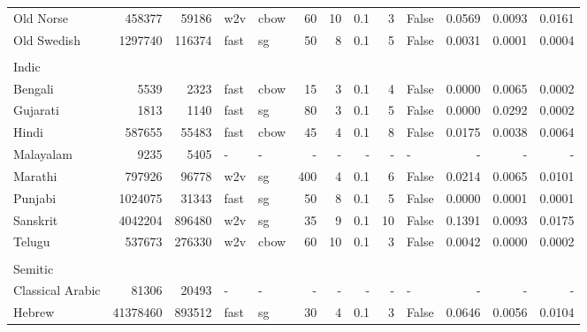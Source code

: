 \documentclass[11pt,a4paper]{article}
\begin{document}
\begin{table}[t]
\begin{tabular}{lrrllrrrrlrrr}
   \quad Old Norse & \num{458377} & \num{59186} & w2v & cbow & \num{60} & \num{10} & \num{.1} & \num{3} & False & \num{0.0569} & \num{0.0093} & \num{0.0161} \\
   \quad Old Swedish & \num{1297740} & \num{116374} &  fast & sg & \num{50} & \num{8} & \num{.1} & \num{5} & False & \num{0.0031} & \num{0.0001} & \num{0.0004} \\
    \multicolumn{13}{l}{}\\[-4pt]
    \multicolumn{13}{l}{Indic}\\
\quad Bengali & \num{5539} & \num{2323} & fast & cbow & \num{15} & \num{3} & \num{.1} & \num{4} & False & \num{0.0000} & \num{0.0065} & \num{0.0002} \\
   \quad Gujarati & \num{1813} & \num{1140} & fast & sg & \num{80} & \num{3} & \num{.1} & \num{5} & False & \num{0.0000} & \num{0.0292} & \num{0.0002} \\
   \quad Hindi & \num{587655} & \num{55483} & fast & cbow & \num{45} & \num{4} & \num{.1} & \num{8} & False & \num{0.0175} & \num{0.0038} & \num{0.0064}\\
   \quad Malayalam & \num{9235} & \num{5405} & - & - & - & - & - & - & - & - & - & - \\
    \quad Marathi  & \num{797926} & \num{96778} & w2v & sg & \num{400} & \num{4} & \num{.1} & \num{6} & False & \num{0.0214} & \num{0.0065} & \num{0.0101} \\
    \quad Punjabi & \num{1024075} & \num{31343} & fast & sg & \num{50} & \num{8} & \num{.1} & \num{5} & False & \num{0.0000} & \num{0.0001} & \num{0.0001} \\
    \quad Sanskrit & \num{4042204} & \num{896480} & w2v & sg & \num{35} & \num{9} & \num{.1} & \num{10} & False & \num{0.1391} & \num{0.0093} & \num{0.0175}\\
    \quad Telugu & \num{537673} & \num{276330} &  w2v & cbow & \num{60} & \num{10} & \num{.1} & \num{3} & False & \num{0.0042} & \num{0.0000} & \num{0.0002} \\
    \multicolumn{13}{l}{}\\[-4pt]
    \multicolumn{13}{l}{Semitic}\\    
  \quad Classical Arabic & \num{81306} & \num{20493} & - & - & - & - & - & - & - & - & - & - \\
   \quad Hebrew & \num{41378460} & \num{893512} & fast & sg & \num{30} & \num{4} & \num{.1} & \num{3} & False & \num{0.0646} & \num{0.0056} & \num{0.0104} \\ 
\bottomrule

\end{tabular}
\end{table}
\end{document}
